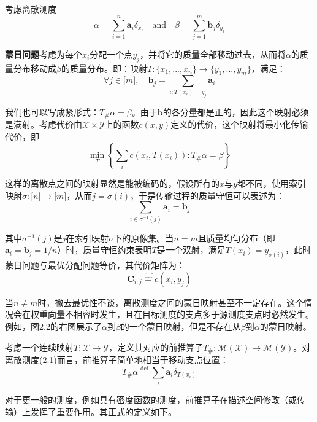 \documentclass[cn,10pt,math=newtx,citestyle=gb7714-2015,bibstyle=gb7714-2015]{elegantbook}
\begin{document}
\begin{postulate}[离散测度的蒙日问题]
考虑离散测度
\begin{equation}
    \label{2.3}
    \alpha=\sum_{i=1}^n \mathbf{a}_i\delta_{x_i}\quad \text{and} \quad \beta=\sum_{j=1}^m\mathbf{b}_j\delta_{y_i}
\end{equation}

\textbf{蒙日问题}考虑为每个$x_i$分配一个点$y_j$，并将它的质量全部移动过去，从而将$\alpha$的质量分布移动成$\beta$的质量分布。即：映射$T:\{x_1,...,x_n\}\to \{y_1,...,y_m\}$，满足：
\begin{equation}
    \label{2.4}
    \forall j\in\mathbb{[}m\mathbb{]},\quad \mathbf{b}_j=\sum_{i:T(x_i)=y_j}\mathbf{a}_i
\end{equation}

我们也可以写成紧形式：$T_\#\alpha=\beta$。由于$\mathbf{b}$的各分量都是正的，因此这个映射必须是满射。考虑代价由$\mathcal{X}\times \mathcal{Y}$上的函数$c(x,y)$定义的代价，这个映射将最小化传输代价，即
\begin{equation}
    \label{2.5}
    \min\limits_T \left\{\sum_i c(x_i,T(x_i)):T_\#\alpha=\beta\right\}
\end{equation}

这样的离散点之间的映射显然是能被编码的，假设所有的$x$与$y$都不同，使用索引映射$\sigma:\mathbb{[}n\mathbb{]}\to \mathbb{[}m\mathbb{]}$，从而$j=\sigma(i)$，于是传输过程的质量守恒可以表述为：
\begin{equation*}
    \sum_{i\in\sigma^{-1}(j)}\mathbf{a}_i=\mathbf{b}_j
\end{equation*}

其中$\sigma^{-1}(j)$是$j$在索引映射$\sigma$下的原像集。当$n=m$且质量均匀分布（即$\mathbf{a}_i=\mathbf{b}_j=1/n$）时，质量守恒约束表明$T$是一个双射，满足$T(x_i)=y_{\sigma(i)}$，此时蒙日问题与最优分配问题等价，其代价矩阵为：
\begin{equation*}
    \mathbf{C}_{i,j}\overset{\text{def}}{=} c(x_i,y_j)
\end{equation*}

当$n\neq m$时，撇去最优性不谈，离散测度之间的蒙日映射甚至不一定存在。这个情况会在权重向量不相容时发生，且在目标测度的支点多于源测度支点时必然发生。例如，图2.2的右图展示了$\alpha$到$\beta$的一个蒙日映射，但是不存在从$\beta$到$\alpha$的蒙日映射。

\end{postulate}

\begin{postulate}[前推算子]
考虑一个连续映射$T:\mathcal{X}\to\mathcal{Y}$，定义其对应的前推算子$T_\#:\mathcal{M(X)}\to \mathcal{M(Y)}$。对离散测度(2.1)而言，前推算子简单地相当于移动支点位置：
\begin{equation*}
    T_\#\alpha\overset{\text{def}}{=} \sum_i \mathbf{a}_i\delta_{T(x_i)}
\end{equation*}

对于更一般的测度，例如具有密度函数的测度，前推算子在描述空间修改（或传输）上发挥了重要作用。其正式的定义如下。

\end{postulate}
\end{document}
